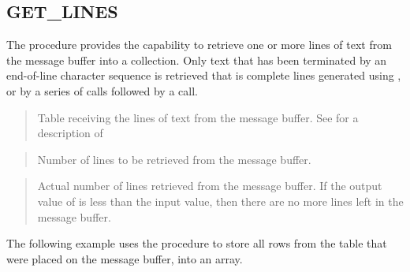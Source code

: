 \documentclass[letterpaper,10pt,english,openany,oneside]{sphinxmanual}
\begin{document}
\subsection{GET\_LINES}
\label{\detokenize{dbms_output:get-lines}}
The  procedure provides the capability to retrieve one or more
lines of text from the message buffer into a collection. Only text that
has been terminated by an end-of-line character sequence is retrieved \textendash{}
that is complete lines generated using , or by a series of 
calls followed by a  call.
\begin{quote}

\end{quote}


\begin{quote}

Table receiving the lines of text from the message buffer. See
 for a description of 
\end{quote}

\begin{quote}

Number of lines to be retrieved from the message buffer.
\end{quote}

\begin{quote}

Actual number of lines retrieved from the message buffer. If the output
value of  is less than the input value, then there are no more
lines left in the message buffer.
\end{quote}


The following example uses the  procedure to store all rows
from the  table that were placed on the message buffer, into an
array.
\end{document}
